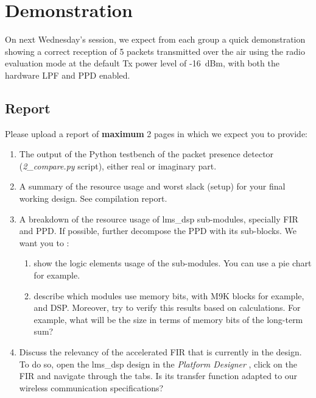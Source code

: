 \section{Demonstration}


On next Wednesday's session, we expect from each group a quick demonstration showing a correct reception of 5 packets transmitted over the air using the radio evaluation mode
at the default Tx power level of -16~dBm, with both the hardware LPF and PPD enabled.


\subsection{Report}

Please upload a report of \textbf{maximum} 2 pages in which we  expect you to provide:

\begin{enumerate}
    \item The output of the Python testbench of the packet presence detector (\textit{2\_compare.py} script), either real or imaginary part.
    \item A summary of the resource usage  and worst slack (setup) for your final working design. See compilation report.
    \item A breakdown of the resource usage of lms\_dsp sub-modules, specially FIR and PPD. If possible, further decompose the PPD with its sub-blocks. We want you to :
    \begin{enumerate}
        \item show the logic elements usage of the sub-modules. You can use a pie chart for example.
        \item describe which modules use memory bits, with M9K blocks for example, and DSP. Moreover, try to verify this results based on calculations. For example, what will be the size in terms of memory bits of the long-term sum?
      \end{enumerate}    
    \item Discuss the relevancy of the accelerated FIR that is currently in the design. To do so, open the lms\_dsp design in the \textit{Platform Designer} , click on the FIR and navigate through the tabs. Is its transfer function adapted to our wireless communication specifications?
     
\end{enumerate}
